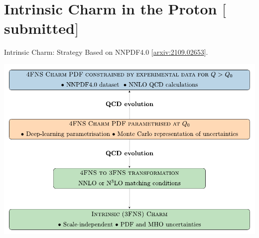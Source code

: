\documentclass[9pt]{beamer}
\providecommand{\iRef}[1]{{\color{mLightGreen}\small $[$#1$]$}}
\begin{document}
\section{Intrinsic Charm in the Proton \iRef{submitted}}

\begin{frame}{Intrinsic Charm: Strategy}
    Based on NNPDF4.0 \iRef{\href{https://arxiv.org/abs/2109.02653}{arxiv:2109.02653}}.

	\begin{center}
        \includegraphics[scale=.6]{strategy}
	\end{center}
\end{frame}
\end{document}
